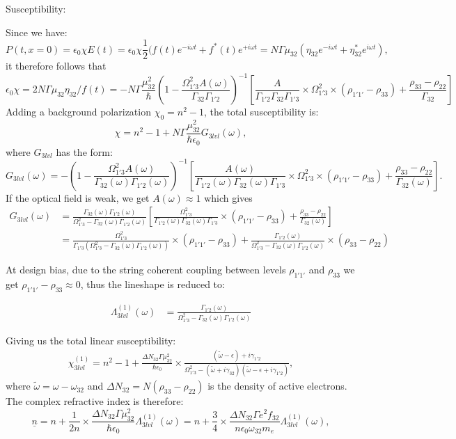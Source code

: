 \documentclass[10pt,letterpaper]{article}
\def\uline{\underline}
\begin{document}
	Susceptibility:
	
	Since we have:
	$$
	P(t,x=0) = \epsilon_0\chi E(t) = \epsilon_0 \chi \frac{1}{2} ( f(t)e^{-i\omega t} +f^*(t)e^{+i\omega t}= N\Gamma\mu_{32}(\eta_{32}e^{-i\omega t}+\eta_{32}^*e^{i\omega t}),
	$$
	it therefore follows that 
	$$
	\epsilon_0 \chi = 2N\Gamma\mu_{32}\eta_{32}/f(t) = -N\Gamma\frac{\mu_{32}^2}{\hbar}(1-\frac{\Omega_{1'3}^2  A(\omega)}{\Gamma_{32}\Gamma_{1'2}})^{-1} \left [ \frac{A}{\Gamma_{1'2}\Gamma_{32}\Gamma_{1'3}}\times \Omega_{1'3}^2\times(\rho_{1'1'}-\rho_{33}) +\frac{\rho_{33}-\rho_{22}}{\Gamma_{32}} \right]
	$$
	Adding a background polarization $\chi_0 = n^2-1$, the total susceptibility is:
	$$
	\chi = n^2-1+N\Gamma\frac{\mu_{32}^2}{\hbar\epsilon_0}G_{3lvl}(\omega),
	$$
	where $G_{3lvl}$ has the form:
	$$
	G_{3lvl}(\omega) = -
	(1-\frac{\Omega_{1'3}^2  A(\omega)}{\Gamma_{32}(\omega)\Gamma_{1'2}(\omega)})^{-1} \left [ \frac{A(\omega)}{\Gamma_{1'2}(\omega)\Gamma_{32}(\omega)\Gamma_{1'3}}\times \Omega_{1'3}^2\times(\rho_{1'1'}-\rho_{33}) +\frac{\rho_{33}-\rho_{22}}{\Gamma_{32}(\omega)} \right].
	$$
	If the optical field is weak, we get $A(\omega) \approx 1$ which gives 
	\begin{align}
	G_{3lvl}(\omega)&= 
	\frac{\Gamma_{32}(\omega)\Gamma_{1'2}(\omega) }{\Omega_{1'3}^2-\Gamma_{32}(\omega)\Gamma_{1'2}(\omega)} \left [ \frac{\Omega_{1'3}^2}{\Gamma_{1'2}(\omega)\Gamma_{32}(\omega)\Gamma_{1'3}}\times(\rho_{1'1'}-\rho_{33}) +\frac{\rho_{33}-\rho_{22}}{\Gamma_{32}(\omega)} \right] \\
	&=  \frac{\Omega_{1'3}^2}{\Gamma_{1'3}(\Omega_{1'3}^2-\Gamma_{32}(\omega)\Gamma_{1'2}(\omega))}\times(\rho_{1'1'}-\rho_{33}) +\frac{\Gamma_{1'2}(\omega)}{\Omega_{1'3}^2-\Gamma_{32}(\omega)\Gamma_{1'2}(\omega)}\times(\rho_{33}-\rho_{22}) 
	\end{align}
	
	At design bias, due to the string coherent coupling between levels $\rho_{1'1'}$ and $\rho_{33}$ we get $\rho_{1'1'} - \rho_{33}\approx {0}$, thus the lineshape is reduced to:
	
	\begin{align}
	\Lambda_{3lvl}^{(1)}(\omega) &= 
	\frac{\Gamma_{1'2}(\omega)}{\Omega_{1'3}^2-\Gamma_{32}(\omega)\Gamma_{1'2}(\omega)} 
	\end{align}
	
	Giving us the total linear susceptibility:
	\begin{align}
	\chi_{3lvl}^{(1)} = n^2-1+\frac{\Delta N_{32}\Gamma\mu_{32}^2}{\hbar\epsilon_0}\times\frac{(\tilde{\omega}-\epsilon)+i\gamma_{1'2}}{\Omega_{1'3}^2-(\tilde{\omega}+i\gamma_{32})(\tilde{\omega}-\epsilon+i\gamma_{1'2})}, 
	\end{align}
	where $\tilde{\omega} = \omega - \omega_{32}$ and $\Delta N_{32} = N(\rho_{33}-\rho_{22})$ is the density of active electrons.  The complex refractive index is therefore:
	$$
	\uline{n} = n+\frac{1}{2n}\times \frac{\Delta N_{32}\Gamma \mu_{32}^2}{\hbar \epsilon_0} \Lambda_{3lvl}^{(1)}({\omega}) = n+\frac{3}{4}\times \frac{\Delta N_{32}\Gamma e^2f_{32}}{n\epsilon_0\omega_{32}m_e} \Lambda_{3lvl}^{(1)}({\omega}),
	$$ 
	
\end{document}
